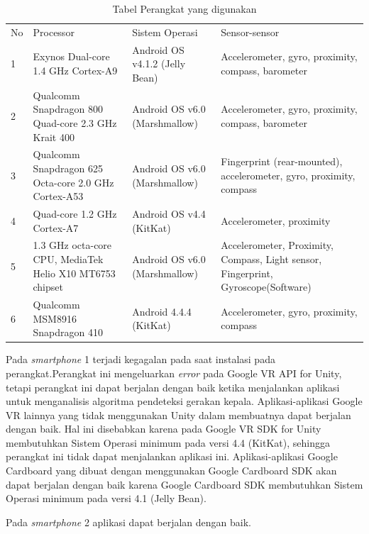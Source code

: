 \begin{table}[]
    \centering
    \begin{tabular}{|p{1cm}||p{4cm}|p{4cm}|p{4cm}|}
    \hline\\
    \hline
       No  & Processor & Sistem Operasi & Sensor-sensor \\
    \hline
        1 &  Exynos Dual-core 1.4 GHz Cortex-A9 & Android OS v4.1.2 (Jelly Bean) & Accelerometer, gyro, proximity, compass, barometer\\
    \hline
        2 &  Qualcomm Snapdragon 800 Quad-core 2.3 GHz Krait 400 & Android OS v6.0 (Marshmallow) & Accelerometer, gyro, proximity, compass, barometer\\
    \hline
        3 &  Qualcomm Snapdragon 625 Octa-core 2.0 GHz Cortex-A53 & Android OS v6.0 (Marshmallow) & Fingerprint (rear-mounted), accelerometer, gyro, proximity, compass\\
    \hline
        4 &  Quad-core 1.2 GHz Cortex-A7 &  Android OS v4.4 (KitKat) & Accelerometer, proximity\\
    \hline
        5 &  1.3 GHz octa-core CPU, MediaTek Helio X10 MT6753 chipset & Android OS v6.0 (Marshmallow) & Accelerometer, Proximity, Compass, Light sensor, Fingerprint, Gyroscope(Software)\\
    \hline
        6 & Qualcomm MSM8916 Snapdragon 410 & Android 4.4.4 (KitKat) & Accelerometer, gyro, proximity, compass\\
    \hline
    \end{tabular}
    \caption{Tabel Perangkat yang digunakan}
    \label{tab:tabel_perangkat_yang_digunakan}
\end{table}

Pada \textit{smartphone} 1 terjadi kegagalan pada saat instalasi pada perangkat.Perangkat ini mengeluarkan \textit{error} pada Google VR API for Unity, tetapi perangkat ini dapat berjalan dengan baik ketika menjalankan aplikasi untuk menganalisis algoritma pendeteksi gerakan kepala. Aplikasi-aplikasi Google VR lainnya yang tidak menggunakan Unity dalam membuatnya dapat berjalan dengan baik. Hal ini disebabkan karena pada Google VR SDK for Unity membutuhkan Sistem Operasi minimum pada versi 4.4 (KitKat), sehingga perangkat ini tidak dapat menjalankan aplikasi ini. Aplikasi-aplikasi Google Cardboard yang dibuat dengan menggunakan Google Cardboard SDK akan dapat berjalan dengan baik karena Google Cardboard SDK membutuhkan Sistem Operasi minimum pada versi 4.1 (Jelly Bean).

Pada \textit{smartphone} 2 aplikasi dapat berjalan dengan baik. 


